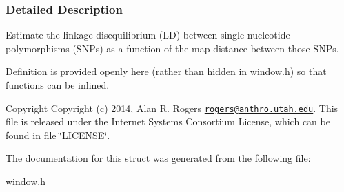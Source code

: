 \subsubsection{Detailed Description}
Estimate the linkage disequilibrium (L\-D) between single nucleotide polymorphisms (S\-N\-Ps) as a function of the map distance between those S\-N\-Ps. 

Definition is provided openly here (rather than hidden in \hyperlink{window_8h}{window.\-h}) so that functions can be inlined.

\begin{DoxyCopyright}{Copyright}
Copyright (c) 2014, Alan R. Rogers \href{mailto:rogers@anthro.utah.edu}{\tt rogers@anthro.\-utah.\-edu}. This file is released under the Internet Systems Consortium License, which can be found in file \char`\"{}\-L\-I\-C\-E\-N\-S\-E\char`\"{}. 
\end{DoxyCopyright}


The documentation for this struct was generated from the following file\-:\begin{DoxyCompactItemize}
\item 
\hyperlink{window_8h}{window.\-h}\end{DoxyCompactItemize}
